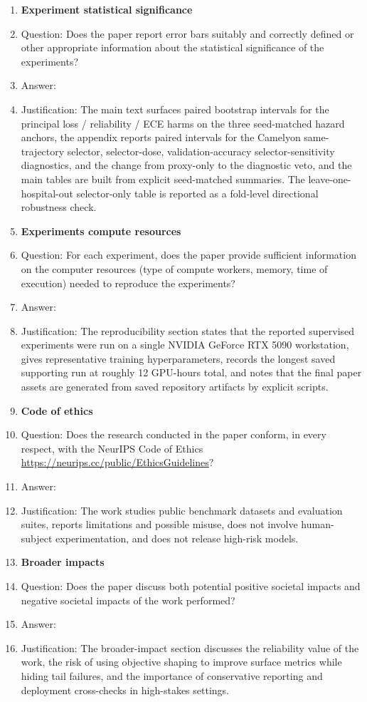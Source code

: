 \begin{enumerate}
\item {\bf Experiment statistical significance}
  \item[] Question: Does the paper report error bars suitably and correctly defined or other appropriate information about the statistical significance of the experiments?
  \item[] Answer: \answerYes{}
  \item[] Justification: The main text surfaces paired bootstrap intervals for the principal loss / reliability / ECE harms on the three seed-matched hazard anchors, the appendix reports paired intervals for the Camelyon same-trajectory selector, selector-dose, validation-accuracy selector-sensitivity diagnostics, and the change from proxy-only to the diagnostic veto, and the main tables are built from explicit seed-matched summaries. The leave-one-hospital-out selector-only table is reported as a fold-level directional robustness check.

\item {\bf Experiments compute resources}
  \item[] Question: For each experiment, does the paper provide sufficient information on the computer resources (type of compute workers, memory, time of execution) needed to reproduce the experiments?
  \item[] Answer: \answerYes{}
  \item[] Justification: The reproducibility section states that the reported supervised experiments were run on a single NVIDIA GeForce RTX 5090 workstation, gives representative training hyperparameters, records the longest saved supporting run at roughly 12 GPU-hours total, and notes that the final paper assets are generated from saved repository artifacts by explicit scripts.

\item {\bf Code of ethics}
  \item[] Question: Does the research conducted in the paper conform, in every respect, with the NeurIPS Code of Ethics \url{https://neurips.cc/public/EthicsGuidelines}?
  \item[] Answer: \answerYes{}
  \item[] Justification: The work studies public benchmark datasets and evaluation suites, reports limitations and possible misuse, does not involve human-subject experimentation, and does not release high-risk models.

\item {\bf Broader impacts}
  \item[] Question: Does the paper discuss both potential positive societal impacts and negative societal impacts of the work performed?
  \item[] Answer: \answerYes{}
  \item[] Justification: The broader-impact section discusses the reliability value of the work, the risk of using objective shaping to improve surface metrics while hiding tail failures, and the importance of conservative reporting and deployment cross-checks in high-stakes settings.


\end{enumerate}
